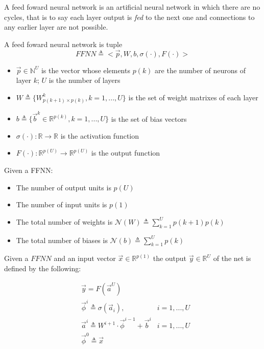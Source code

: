 
A feed foward neural network is an artificial neural network in which there are no cycles, that is to say each layer output is \textit{fed} to the next one and connections to any earlier layer are not possible. 


\begin{defn}
\label{def_ffnn}
A feed foward neural network is tuple
$$FFNN\triangleq<\vec{p},W,b,\sigma(\cdot),F(\cdot)>$$
\begin{itemize}
 \item $\vec{p} \in \mathbb{N}^U$ is the vector whose elements $p(k)$ are the number of neurons of layer $k$; $U$ is the number of layers
 \item $W\triangleq \{W^k_{p(k+1) \times p(k)}, k=1,...,U \}$ is the set of weight matrixes of each layer
 \item $b \triangleq \{\vec{b}^k \in \mathbb{R}^{p(k)}, k=1,...,U \} $ is the set of bias vectors
 \item $\sigma(\cdot): \mathbb{R}\rightarrow \mathbb{R}$ is the activation function
 \item $F(\cdot): \mathbb{R}^{p(U)}\rightarrow \mathbb{R}^{p(U)}$ is the output function
\end{itemize}
\end{defn}

\begin{remark}{}
Given a FFNN:
\begin{itemize}
 \item The number of output units is $p(U)$
 \item The number of input units is $p(1)$
 \item The total number of weights is $\mathcal{N}(W) \triangleq \sum_{k=1}^U p(k+1)p(k)$
 \item The total number of biases is $\mathcal{N}(b) \triangleq \sum_{k=1}^U p(k)$
\end{itemize}
\end{remark}

\begin{defn}
Given a $FFNN$ and an input vector $\vec{x} \in \mathbb{R}^{p(1)}$ the output $\vec{y} \in \mathbb{R}^U$ of the net is defined by the following:

\begin{align}
&\vec{y}=F(\vec{a}^{U}) &\\
&\vec{\phi}^{i} \triangleq \sigma(\vec{a}_{i}), & i=1,...,U\\
&\vec{a}^{i} \triangleq W^{i+1} \cdot \vec{\phi}^{i-1} +\vec{b}^i  & i=1,...,U\\
&\vec{\phi}^{0} \triangleq \vec{x} &
\end{align}
\end{defn}


